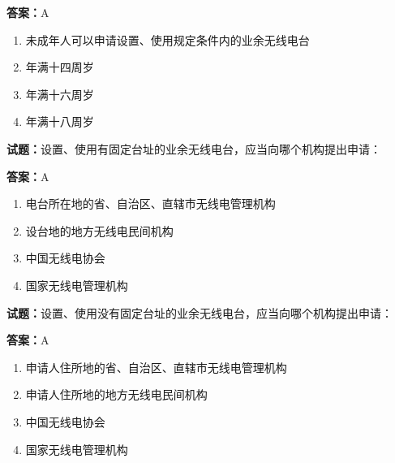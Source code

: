 \documentclass{ctexbook}
\begin{document}
\textbf{答案：}A 

\begin{enumerate}[leftmargin=3em]
  \item 未成年人可以申请设置、使用规定条件内的业余无线电台 

  \item 年满十四周岁 

  \item 年满十六周岁 

  \item 年满十八周岁 

\end{enumerate}





\vspace{1em}

\textbf{试题：}设置、使用有固定台址的业余无线电台，应当向哪个机构提出申请： 

\textbf{答案：}A 

\begin{enumerate}[leftmargin=3em]
  \item 电台所在地的省、自治区、直辖市无线电管理机构 

  \item 设台地的地方无线电民间机构 


  \item 中国无线电协会 

  \item 国家无线电管理机构 

\end{enumerate}





\vspace{1em}

\textbf{试题：}设置、使用没有固定台址的业余无线电台，应当向哪个机构提出申请： 

\textbf{答案：}A 

\begin{enumerate}[leftmargin=3em]
  \item 申请人住所地的省、自治区、直辖市无线电管理机构 

  \item 申请人住所地的地方无线电民间机构 

  \item 中国无线电协会 

  \item 国家无线电管理机构 

\end{enumerate}
\end{document}
